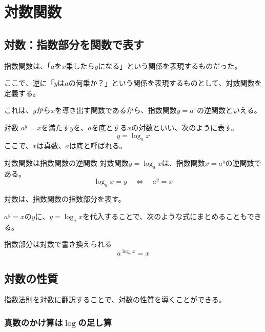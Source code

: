 \documentclass[../../imaging-math]{subfiles}
\begin{document}
\section{対数関数}

\subsection{対数：指数部分を関数で表す}

指数関数は、「$a$を$x$乗したら$y$になる」という関係を表現するものだった。

ここで、逆に「$y$は$a$の何乗か？」という関係を表現するものとして、対数関数を定義する。

これは、$y$から$x$を導き出す関数であるから、指数関数$y=a^x$の逆関数といえる。

\begin{definition}{対数}
  \titlegap
  $a^y = x$を満たす$y$を、$a$を底とする$x$の対数といい、次のように表す。
  \LARGE
  \begin{equation}
    y = \log_a x
  \end{equation}
  \normalsize
  ここで、$x$は真数、$a$は底と呼ばれる。
\end{definition}

\begin{definition}{対数関数は指数関数の逆関数}
  \titlegap
  対数関数$y=\log_a x$は、指数関数$x = a^y$の逆関数である。
  \LARGE
  \begin{equation}
    \log_a x = y \quad \Longleftrightarrow  \quad a^y = x
  \end{equation}
\end{definition}

対数は、指数関数の指数部分を表す。

$a^y = x$の$y$に、$y=\log_a x$を代入することで、次のような式にまとめることもできる。

\begin{theorem}{指数部分は対数で書き換えられる}
  \LARGE
  \begin{equation}
    a^{\log_a x} = x
  \end{equation}
\end{theorem}

\subsection{対数の性質}

指数法則を対数に翻訳することで、対数の性質を導くことができる。

\subsubsection{真数のかけ算は$\log$の足し算}
\end{document}
